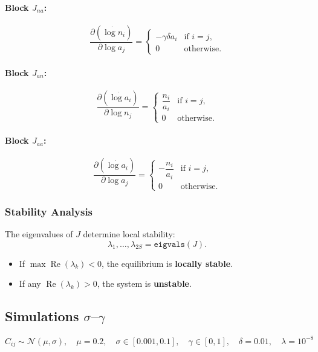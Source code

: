 \documentclass{article}
\begin{document}
\paragraph{Block $J_{na}$:}
\[
\frac{\partial (\dot{\log n_i})}{\partial \log a_j} =
\begin{cases}
- \gamma \delta a_i & \text{if } i = j, \\
0 & \text{otherwise}.
\end{cases}
\]

\paragraph{Block $J_{an}$:}
\[
\frac{\partial (\dot{\log a_i})}{\partial \log n_j} =
\begin{cases}
\dfrac{n_i}{a_i} & \text{if } i = j, \\
0 & \text{otherwise}.
\end{cases}
\]

\paragraph{Block $J_{aa}$:}
\[
\frac{\partial (\dot{\log a_i})}{\partial \log a_j} =
\begin{cases}
- \dfrac{n_i}{a_i} & \text{if } i = j, \\
0 & \text{otherwise}.
\end{cases}
\]

\subsubsection{Stability Analysis}

The eigenvalues of $J$ determine local stability:
\[
\lambda_1, \dots, \lambda_{2S} = \texttt{eigvals}(J).
\]
\begin{itemize}
    \item If $\max \operatorname{Re}(\lambda_k) < 0$, the equilibrium is \textbf{locally stable}.
    \item If any $\operatorname{Re}(\lambda_k) > 0$, the system is \textbf{unstable}.
\end{itemize}
\clearpage

\subsection{Simulations $\sigma$–$\gamma$}
\[
C_{ij} \sim \mathcal{N}(\mu, \sigma), \quad 
\mu = 0.2,\quad \sigma \in [0.001, 0.1], \quad 
\gamma \in [0, 1], \quad \delta = 0.01, \quad \lambda = 10^{-8}
\]
\end{document}
